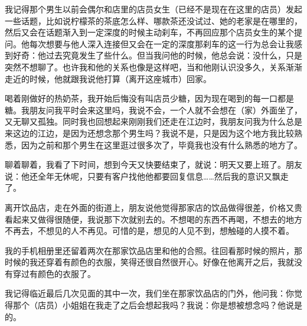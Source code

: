 我记得那个男生以前会偶尔和店里的店员女生（已经不是现在在这里的店员）发起一些话题，比如说柠檬茶的茶底怎么样、哪款茶还没试过、她的老家是在哪里的，然后又会在话题渐入到一定深度的时候主动刹车，不再回应那个店员女生的某个提问。他每次想要与他人深入连接但又会在一定的深度那刹车的这一行为总会让我感到好奇：他过去究竟发生了些什么。但当我问他的时候，他总会说：没什么，只是突然不想聊了。也许我和他的关系也像是这样吧，当和他刚认识没多久，关系渐渐走近的时候，他就跟我说他打算（离开这座城市）回家。

喝着刚做好的热奶茶，我开始后悔没有叫店员少糖，因为现在喝到的每一口都是糖。我朋友问我平时会来这里吗，我说不会，一个人就不会想在（家）外面坐了，又无聊又孤独。同时我也回想起来刚刚我们还走在江边时，我朋友问我为什么总是来这边的江边，是因为还想念那个男生吗？我说不是，只是因为这个地方我比较熟悉，因为之前和那个男生在这里逛过很多次了，毕竟我也没有什么熟悉的地方了。

聊着聊着，我看了下时间，想到今天又快要结束了，就说：明天又要上班了。朋友说：他还全年无休呢，只要有客户找他他都要回复信息……然后我的意识又飘走了。

离开饮品店，走在外面的街道上，朋友说他觉得那家店的饮品做得很差，价格又贵看起来又做得很随便，我说那下次就别去的。不想喝的东西不再喝，不想去的地方不再去，不想见的人不再见。可惜的是，想见的人见不到，想触碰的人摸不着。

我的手机相册里还留着两次在那家饮品店里和他的合照。往回看那时候的照片，那时候的我还穿着有颜色的衣服，笑得还很自然很开心。好像在他离开之后，我就没有穿过有颜色的衣服了。

我记得临近最后几次见面的其中一次，我们坐在那家饮品店的门外，他问我：你觉得那个（店员）小姐姐在我走了之后会想起我吗？我说：你是想被想念吗？他说是的。


